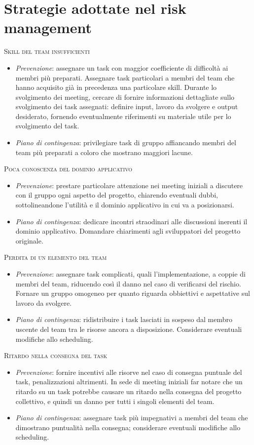 \section{Strategie adottate nel risk management}
\textsc{Skill del team insufficienti}
\begin{itemize}
\item \textit{Prevenzione}: assegnare un task con maggior coefficiente di difficoltà ai membri più preparati. Assegnare task particolari a membri del team che hanno acquisito già in precedenza una particolare skill. Durante lo svolgimento dei meeting, cercare di fornire informazioni dettagliate sullo svolgimento dei task assegnati: definire input, lavoro da svolgere e output desiderato, fornendo eventualmente riferimenti su materiale utile per lo svolgimento del task.
\item \textit{Piano di contingenza}: privilegiare task di gruppo affiancando membri del team più preparati a coloro che mostrano maggiori lacune.
\end{itemize}
\textsc{Poca conoscenza del dominio applicativo}
\begin{itemize}
\item \textit{Prevenzione}: prestare particolare attenzione nei meeting iniziali a discutere con il gruppo ogni aspetto del progetto, chiarendo eventuali dubbi, sottolineandone l'utilità e il dominio applicativo in cui va a posizionarsi. 
\item \textit{Piano di contingenza}: dedicare incontri straodinari alle discussioni inerenti il dominio applicativo. Domandare chiarimenti agli sviluppatori del progetto originale.
\end{itemize}
\textsc{Perdita di un elemento del team}
\begin{itemize}
\item \textit{Prevenzione}: assegnare task complicati, quali l'implementazione, a coppie di membri del team, riducendo così il danno nel caso di verificarsi del rischio. Fornare un gruppo omogeneo per quanto riguarda obbiettivi e aspettative sul lavoro da svolgere.
\item \textit{Piano di contingenza}: ridistribuire i task lasciati in sospeso dal membro uscente del team tra le risorse ancora a disposizione. Considerare eventuali modifiche allo scheduling.  
\end{itemize}
\textsc{Ritardo nella consegna del task}
\begin{itemize}
\item \textit{Prevenzione}: fornire incentivi alle risorve nel caso di consegna puntuale del task, penalizzazioni altrimenti. In sede di meeting iniziali far notare che un ritardo su un task potrebbe causare un ritardo nella consegna del progetto collettivo, e quindi un danno per tutti i singoli elementi del team.
\item \textit{Piano di contingenza}: assegnare task più impegnativi a membri del team che dimostrano puntualità nella consegna; considerare eventuali modifiche allo scheduling.
\end{itemize}
